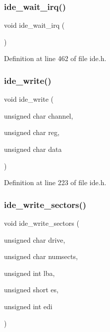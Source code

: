 \subsubsection{\texorpdfstring{ide\+\_\+wait\+\_\+irq()}{ide\_wait\_irq()}}
{\footnotesize\ttfamily void ide\+\_\+wait\+\_\+irq (\begin{DoxyParamCaption}{ }\end{DoxyParamCaption})}



Definition at line 462 of file ide.\+h.

\mbox{\label{a00005_afdb22c37a32d86fcb64e55b3edab4790_afdb22c37a32d86fcb64e55b3edab4790}} 
\subsubsection{\texorpdfstring{ide\+\_\+write()}{ide\_write()}}
{\footnotesize\ttfamily void ide\+\_\+write (\begin{DoxyParamCaption}\item[{unsigned char}]{channel,  }\item[{unsigned char}]{reg,  }\item[{unsigned char}]{data }\end{DoxyParamCaption})}



Definition at line 223 of file ide.\+h.

\mbox{\label{a00005_a8632fb3a8cd41b7d60ee56942afbde03_a8632fb3a8cd41b7d60ee56942afbde03}} 
\subsubsection{\texorpdfstring{ide\+\_\+write\+\_\+sectors()}{ide\_write\_sectors()}}
{\footnotesize\ttfamily void ide\+\_\+write\+\_\+sectors (\begin{DoxyParamCaption}\item[{unsigned char}]{drive,  }\item[{unsigned char}]{numsects,  }\item[{unsigned int}]{lba,  }\item[{unsigned short}]{es,  }\item[{unsigned int}]{edi }\end{DoxyParamCaption})}



